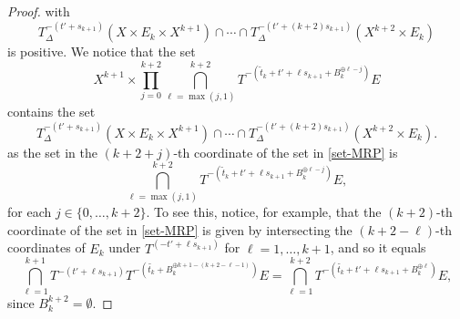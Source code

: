 \documentclass[letter, 11pt]{article}
\theoremstyle{definition}
\theoremstyle{plain}
\newcommand{\1}{\mathbbm{1}}
\begin{document}
\begin{proof}
with 
$$T_\Delta^{-(t'+s_{k+1})} (X\times  E_k\times X^{k+1}) \cap \cdots \cap T_{\Delta}^{-(t'+(k+2)s_{k+1})} (X^{k+2} \times E_k)$$
is positive. We notice that the set 
$$X^{k+1}\times \prod_{j=0}^{k+2}  \bigcap_{\ell=\max(j,1)}^{k+2}  T^{-\left( \tilde{t}_k+t'+\ell s_{k+1}+ B_k^{\oplus \ell-j} \right)}  E  $$
contains the set 
\begin{equation}\label{set-MRP}
     T_\Delta^{-(t'+s_{k+1})} (X\times  E_k\times X^{k+1}) \cap \cdots \cap T_{\Delta}^{-(t'+(k+2)s_{k+1})} (X^{k+2} \times E_k).
\end{equation}
as the set in the $(k+2+j)$-th coordinate of the set in \eqref{set-MRP} is
$$\bigcap_{\ell=\max(j,1)}^{k+2}  T^{-\left( \tilde{t}_k+t'+\ell s_{k+1}+ B_k^{\oplus \ell-j} \right)}  E,  $$
for each $j\in \{0,\ldots,k+2\}$. To see this, notice, for example, that the $(k+2)$-th coordinate of the set in \eqref{set-MRP} is given by intersecting the $(k+2-\ell)$-th coordinates of $E_k$ under $T^{(-t'+\ell s_{k+1})}$ for $\ell=1,\ldots,k+1$, and so it equals 
$$\bigcap_{\ell=1}^{k+1} T^{-(t'+\ell s_{k+1})}  T^{-\left( \tilde{t_k} + B_k^{\oplus k+1-(k+2-\ell-1)} \right)}  E = \bigcap_{\ell=1}^{k+2} T^{-\left( \tilde{t_k}+t'+\ell s_{k+1} + B_k^{\oplus \ell} \right)}  E,$$
since $B_k^{k+2}=\emptyset$.


\end{proof}
\end{document}
